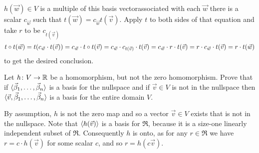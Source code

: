 \begin{exercises}
\begin{answer}
      $h(\vec{w})\in V$ is a multiple of this basis vector\Dash associated
      with each $\vec{w}$ there is a scalar 
      \( c_{\vec{w}} \)  
      such that \( t(\vec{w})=c_{\vec{w}}t(\vec{v}) \).
      Apply \( t \) to both sides of that equation 
      and take \( r \) to be \( c_{t(\vec{v})} \)
      \begin{equation*}
        t\mathbin\circ t(\vec{w})
        =t(c_{\vec{w}}\cdot t(\vec{v}))
        =c_{\vec{w}}\cdot t\mathbin\circ t(\vec{v})
        =c_{\vec{w}}\cdot c_{t(\vec{v})}\cdot t(\vec{v})
        =c_{\vec{w}}\cdot r\cdot t(\vec{v})
        =r\cdot c_{\vec{w}}\cdot t(\vec{v})
        =r\cdot t(\vec{w})
      \end{equation*}
      to get the desired conclusion.  
    \end{answer}
  \item 
    Let \( \mbox{$h\colon V\to \mathbb{R}$} \) be a homomorphism, but not the
    zero homomorphism.
    Prove that if \( \langle\vec{\beta}_1,\dots,\vec{\beta}_n\rangle \) is a
    basis for the nullspace and if \( \vec{v}\in V \) is not in the nullspace
    then \( \langle\vec{v},\vec{\beta}_1,\dots,\vec{\beta}_n\rangle \) is a
    basis for the entire domain \( V \).
    \begin{answer}
      By assumption, \( h \) is not the zero map 
      and so a vector \( \vec{v}\in V \) exists that is not in the nullspace.
      Note that \( \langle h(\vec{v})\rangle \) is a basis for \( \Re \), 
      because it is a size-one linearly independent subset of \( \Re \).
      Consequently \( h \) is onto, as for any \( r\in\Re \) we have
      \( r=c\cdot h(\vec{v}) \) for some scalar \( c \), and so
      \( r=h(c\vec{v}) \).


\end{answer}
\end{exercises}
